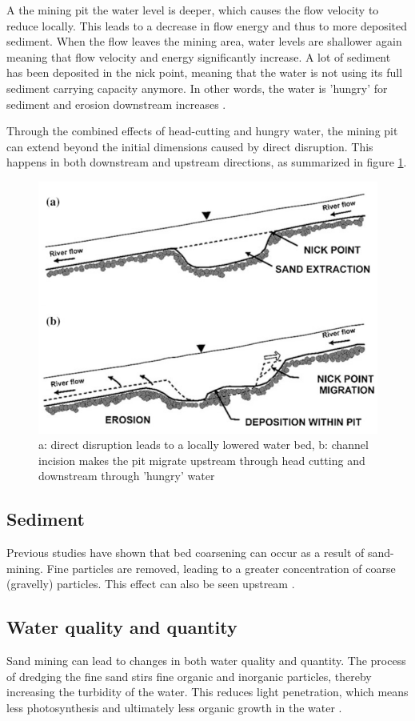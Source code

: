 A the mining pit the water level is deeper, which causes the flow velocity to reduce locally. This leads to a decrease in flow energy and thus to more deposited sediment. When the flow leaves the mining area, water levels are shallower again meaning that flow velocity and energy significantly increase. A lot of sediment has been deposited in the nick point, meaning that the water is not using its full sediment carrying capacity anymore. In other words, the water is 'hungry' for sediment and erosion downstream increases \autocite{sand-mining-boek}. 

Through the combined effects of head-cutting and hungry water, the mining pit can extend beyond the initial dimensions caused by direct disruption. This happens in both downstream and upstream directions, as summarized in figure \ref{fig:channelbedeffects}.

\begin{figure}[H]
    \centering
    \includegraphics[width=0.75\linewidth]{figures/channelbedeffects.png}
    \caption{a: direct disruption leads to a locally lowered water bed, b: channel incision makes the pit migrate upstream through head cutting and downstream through 'hungry' water \autocite{sand-mining-boek}}
    \label{fig:channelbedeffects}
\end{figure}

\subsection{Sediment}
Previous studies have shown that bed coarsening can occur as a result of sand-mining. Fine particles are removed, leading to a greater concentration of coarse (gravelly) particles. This effect can also be seen upstream \autocite{sand-mining-boek}.

\subsection{Water quality and quantity}
Sand mining can lead to changes in both water quality and quantity. The process of dredging the fine sand stirs fine organic and inorganic particles, thereby increasing the turbidity of the water. This reduces light penetration, which means less photosynthesis and ultimately less organic growth in the water \autocite{sharipEffectsSeasonSand2014}.

